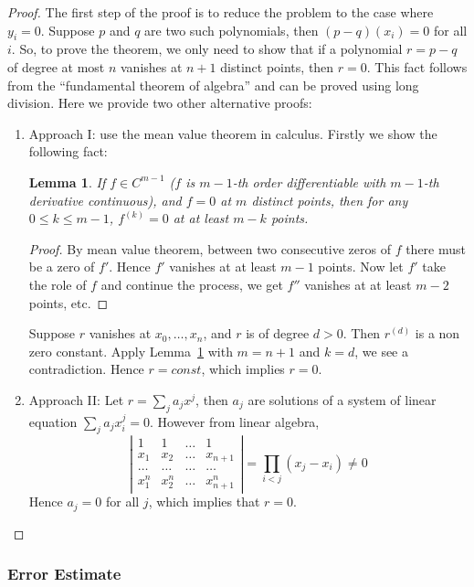 \documentclass[20pt]{article} %
\theoremstyle{break}
\newtheorem{lem}[definition]{Lemma}
\begin{document}
  \begin{proof}
    The first step of the proof is to reduce the problem to the case where $y_i=0$. Suppose $p$ and $q$ are two such polynomials, then $(p-q)(x_i)=0$ for all $i$. So, to prove the theorem, we only need to show that if a polynomial $r=p-q$ of degree at most $n$ vanishes at $n+1$ distinct points, then $r=0$. This fact follows from the ``fundamental theorem of algebra'' and can be proved using long division. Here we provide two other alternative proofs:

    \newpage
    \begin{enumerate}
    \item Approach I: use the mean value theorem in calculus. Firstly we show the following fact:
      \begin{lem}\label{key_lem} If $f \in C^{m-1}$ ($f$ is $m-1$-th order differentiable with $m-1$-th derivative continuous), and $f=0$ at $m$ distinct points, then for any $0\leq k\leq m-1$, $f^{(k)}=0$ at at least $m-k$ points.
      \end{lem}
      \begin{proof}
       By mean value theorem, between two consecutive zeros of $f$ there must be a zero of $f'$. Hence $f'$ vanishes at at least $m-1$ points. Now let $f'$ take the role of $f$ and continue the process, we get $f''$ vanishes at at least $m-2$ points, etc. 
      \end{proof}
      Suppose $r$ vanishes at $x_0, \dots, x_n$, and $r$ is of degree $d>0$. Then $r^{(d)}$ is a non zero constant. Apply Lemma~\ref{key_lem} with $m=n+1$ and $k=d$, we see a contradiction. Hence $r=const$, which implies $r=0$.
      \newpage
  \item Approach II: Let $r=\sum_ja_jx^j$, then $a_j$ are solutions of a system of linear equation $\sum_ja_jx_i^j=0$. However from linear algebra, 
  \[\left|\begin{array}{cccc}1 & 1& \dots & 1\\ x_1 & x_2 &\dots &x_{n+1}\\ \dots & \dots & \dots & \dots \\ x_1^n & x_2^n & \dots & x_{n+1}^n\end{array}\right|=\prod_{i<j}(x_j-x_i)\not=0\]
Hence $a_j=0$ for all $j$, which implies that $r=0$.  
    \end{enumerate}
  \end{proof}

  \newpage

  \subsubsection{Error Estimate}
  
\end{document}
